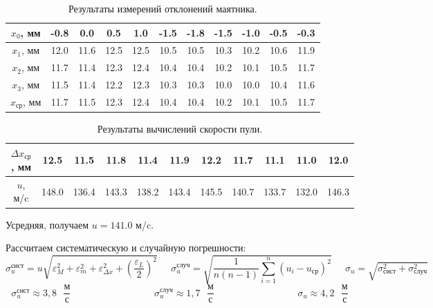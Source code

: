 \documentclass[
	a4paper, %
	12pt, %
]{article}
\begin{document}
	\begin{table}[h]
		\centering
		\begin{tabular}[H]{|c|c|c|c|c|c|c|c|c|c|c|}
			\hline
			$x_0$, мм & -0.8 & 0.0 & 0.5 & 1.0 & -1.5 & -1.8 & -1.5 & -1.0 & -0.5 & -0.3  \\
			\hline
			$x_1$, мм & 12.0 & 11.6 & 12.5 & 12.5 & 10.5 & 10.5 & 10.3 & 10.2 & 10.6 & 11.9  \\
			\hline
			$x_2$, мм & 11.7 & 11.4 & 12.3 & 12.4 & 10.4 & 10.4 & 10.2 & 10.1 & 10.5 & 11.7  \\
			\hline
			$x_3$, мм & 11.5 & 11.4 & 12.2 & 12.3 & 10.3 & 10.3 & 10.0 & 10.0 & 10.4 & 11.6  \\
			\hline
			$x_{\text{ср}}$, мм & 11.7 & 11.5 & 12.3 & 12.4 & 10.4 & 10.4 & 10.2 & 10.1 & 10.5 & 11.7  \\
			\hline
		\end{tabular}
		\caption{Результаты измерений отклонений маятника.}
		\label{table:2}
	\end{table}
	
	\newpage
	
	\begin{table}[h]
		\centering
		\begin{tabular}[H]{|c|c|c|c|c|c|c|c|c|c|c|}
			\hline
			$\Delta x_{\text{ср}}$, мм & 12.5 & 11.5 & 11.8 & 11.4 & 11.9 & 12.2 & 11.7 & 11.1 & 11.0 & 12.0  \\
			\hline
			$u$, м/c & 148.0 & 136.4 & 143.3 & 138.2 & 143.4  & 145.5 & 140.7 & 133.7 & 132.0 & 146.3  \\
			\hline
		\end{tabular}
		\caption{Результаты вычислений скорости пули.}
		\label{table:3}
	\end{table}
	
	Усредняя, получаем $u=141.0$ м/c.
	
	Рассчитаем систематическую и случайную погрешности:
	\begin{equation}
		\sigma_u^{\text{сист}} =u \sqrt{\varepsilon_M^2 + \varepsilon_m^2 + \varepsilon_{\Delta x}^2 + \left(\frac{\varepsilon_L}{2} \right)^2}  \;\;\;\;\; \sigma_u^{\text{случ}} = \sqrt{ \frac{1}{n(n-1)} \sum_{i=1}^{n}(u_i - u_{\text{ср}})^2} \;\;\;\;\; \sigma_u =\sqrt{\sigma_{\text{сист}}^2 + \sigma_\text{случ}^2} 
	\end{equation}
	\begin{equation}
		\sigma_u^\text{сист}\approx 3,8 \text{ }\dfrac{\text{м}}{\text{с}} \;\;\;\;\;\;\;\;\;\;\;\;\;\;\;\;\;\;\;\;\;\;\;\;\;\;\;\;\;\;\; \sigma_u^\text{случ}\approx 1,7 \text{ }\dfrac{\text{м}}{\text{с}} \;\;\;\;\;\;\;\;\;\;\;\;\;\;\;\;\;\;\;\;\;\;\;\;\;\;\;\;\;\;\;
\sigma_u \approx 4,2 \text{ }\dfrac{\text{м}}{\text{с}}
	\end{equation}
	
\end{document}
